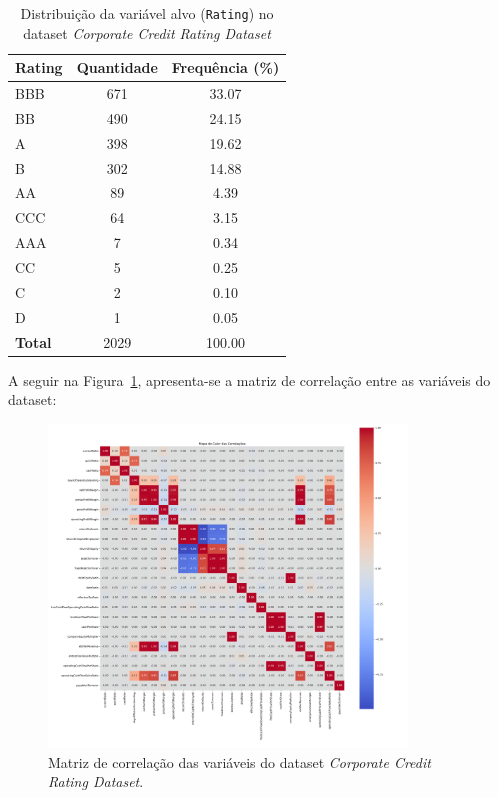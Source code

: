\begin{table}[H]
\centering
\caption{Distribuição da variável alvo (\texttt{Rating}) no dataset \textit{Corporate Credit Rating Dataset}}
\label{tab:dist_rating}
\begin{tabular}{lcc}
\hline
\textbf{Rating} & \textbf{Quantidade} & \textbf{Frequência (\%)} \\
\hline
BBB   & 671 & 33.07 \\
BB    & 490 & 24.15 \\
A     & 398 & 19.62 \\
B     & 302 & 14.88 \\
AA    & 89  & 4.39  \\
CCC   & 64  & 3.15  \\
AAA   & 7   & 0.34  \\
CC    & 5   & 0.25  \\
C     & 2   & 0.10  \\
D     & 1   & 0.05  \\
\hline
\textbf{Total} & 2029 & 100.00 \\
\hline
\end{tabular}
\end{table}

A seguir na Figura~\ref{fig:matriz_correlacao_corporate_credit_rating}, apresenta-se a matriz de correlação entre as variáveis do dataset:

\begin{figure}[H]
    \centering
    \includegraphics[width=0.85\textwidth]{figs/Correlacoes_Corporate_Credit_Rating.png}
    \caption{Matriz de correlação das variáveis do dataset \textit{Corporate Credit Rating Dataset}.}
    \label{fig:matriz_correlacao_corporate_credit_rating}
\end{figure}


